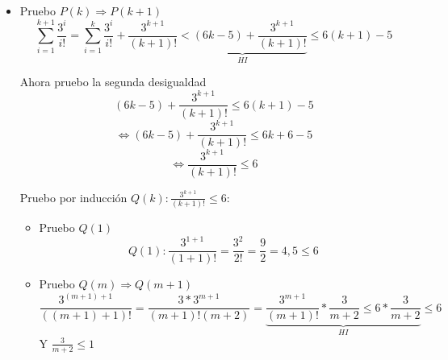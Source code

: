 \documentclass[10pt,a4paper]{article}
\begin{document}
\begin{enumerate}
\begin{itemize}
	\item Pruebo $P(k)\Rightarrow P(k+1)$
	$$\sum^{k+1}_{i=1}\frac{3^{i}}{i!}=\sum^{k}_{i=1}\frac{3^{i}}{i!}+ \frac{3^{k+1}}{(k+1)!}\underbrace{ < (6k-5)+ \frac{3^{k+1}}{(k+1)!}}_{HI}\leq 6(k+1)-5$$
	
	Ahora pruebo la segunda desigualdad
	$$(6k-5)+ \frac{3^{k+1}}{(k+1)!}\leq 6(k+1)-5$$
	$$\Leftrightarrow (6k-5)+ \frac{3^{k+1}}{(k+1)!}\leq 6k+6-5$$
	$$\Leftrightarrow  \frac{3^{k+1}}{(k+1)!}\leq 6$$
	
	Pruebo por inducción $Q(k):\frac{3^{k+1}}{(k+1)!}\leq 6$:
		\begin{itemize}
		\item Pruebo $Q(1)$
		$$Q(1):\frac{3^{1+1}}{(1+1)!}=\frac{3^{2}}{2!}=\frac{9}{2}=4,5 \leq 6$$
		
		\item Pruebo $Q(m)\Rightarrow Q(m+1)$
		$$\frac{3^{(m+1)+1}}{((m+1)+1)!}= \frac{3*3^{m+1}}{(m+1)!(m+2)}= \underbrace{ \frac{3^{m+1}}{(m+1)!}*\frac{3}{m+2}\leq 6 * \frac{3}{m+2}}_{HI}\leq 6$$
		Y $\frac{3}{m+2}\leq 1$
		\end{itemize}			
	
	\end{itemize}
	
\end{enumerate}
\end{document}
